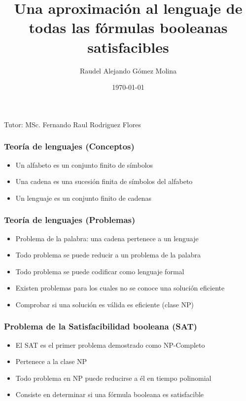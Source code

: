 \documentclass{beamer}
\title{Una aproximación al lenguaje de todas las fórmulas booleanas satisfacibles}
\author{Raudel Alejando Gómez Molina}
\institute{Facultad de Matemática y Computación \\ Universidad de La Habana}
\date{\today}
\newcommand{\tutor}{MSc. Fernando Raul Rodriguez Flores} %
\begin{document}
\begin{frame}
    \titlepage
    \vspace{1cm} %
    \begin{center}
        Tutor: \tutor \\ %
        \smallskip
    \end{center}
\end{frame}

\begin{frame}
    \frametitle{Teoría de lenguajes (Conceptos)}
    
    \begin{itemize}
        \item Un alfabeto es un conjunto finito de símbolos
              \pause
        \item Una cadena es una sucesión finita de símbolos del alfabeto
              \pause
        \item Un lenguaje es un conjunto finito de cadenas
    \end{itemize}
\end{frame}

\begin{frame}
    \frametitle{Teoría de lenguajes (Problemas)}
    
    \begin{itemize}
        \item Problema de la palabra: una cadena pertenece a un lenguaje
              \pause 
        \item Todo problema se puede reducir a un problema de la palabra
              \pause
        \item Todo problema se puede codificar como lenguaje formal
              \pause
        \item Existen problemas para los cuales no se conoce una solución eficiente
              \pause
        \item Comprobar si una solución es válida es eficiente (clase NP)
    \end{itemize}
\end{frame}

\begin{frame}
    \frametitle{Problema de la Satisfacibilidad booleana (SAT)}
    
    \begin{itemize}
        \item El SAT es el primer problema demostrado como NP-Completo
              \pause
        \item Pertenece a la clase NP
              \pause
        \item Todo problema en NP puede reducirse a él en tiempo polinomial
              \pause
        \item Consiste en determinar si una fórmula booleana es satisfacible
    \end{itemize}
\end{frame}
\end{document}

